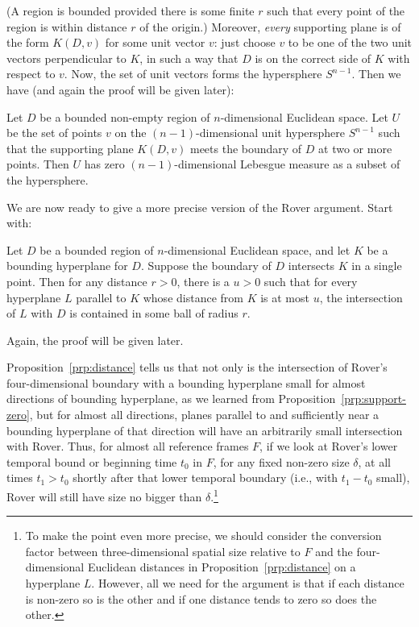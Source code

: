 (A region is bounded provided there is some finite $r$ such that every point of the region is within distance $r$ of the origin.) Moreover, \textit{every} supporting plane is of the form $K(D,v)$ for some unit vector $v$: just choose $v$ to be one of the two unit vectors perpendicular to $K$, in such a way that $D$ is on the correct side of $K$ with respect to $v$. Now, the set of unit vectors forms the hypersphere $S^{n-1}$. Then we have (and again the proof will be given later):

\begin{prp}\label{prp:support-zero}
Let $D$ be a bounded non-empty region of $n$-dimensional Euclidean space. Let $U$ be the set of points $v$ on the 
$(n-1)$-dimensional unit hypersphere $S^{n-1}$ such that the supporting plane $K(D,v)$ meets the boundary of $D$ at two or more points. Then $U$ has zero $(n-1)$-dimensional Lebesgue measure as a subset of the hypersphere.
\end{prp}

We are now ready to give a more precise version of the Rover argument. Start with:

\begin{prp}\label{prp:distance} Let $D$ be a bounded region of $n$-dimensional Euclidean space, and let $K$ be a bounding hyperplane for $D$. Suppose the boundary of $D$ intersects $K$ in a single point. Then for any distance $r>0$, there is a $u>0$ such that for every hyperplane $L$ parallel to $K$ whose distance from $K$ is at most $u$, the intersection of $L$ with $D$ is contained in some ball of radius $r$.
\end{prp}

Again, the proof will be given later.

Proposition~\ref{prp:distance} tells us that not only is the intersection of Rover's four-dimensional
boundary with a bounding hyperplane small for almost directions of bounding hyperplane, as we learned from 
Proposition~\ref{prp:support-zero}, but for almost all directions, planes parallel to and sufficiently near
a bounding hyperplane of that direction will have an arbitrarily small intersection with Rover. Thus, for almost
all reference frames $F$, if we look at Rover's lower temporal bound or beginning time $t_0$ in $F$, for any fixed
non-zero size $\delta$, at all times $t_1>t_0$ shortly after that lower temporal boundary (i.e., with $t_1-t_0$ 
small), Rover will still have size no bigger than $\delta$.\footnote{To make the point even more precise, we should
consider the conversion factor between three-dimensional spatial size relative to $F$ and the four-dimensional Euclidean distances in Proposition~\ref{prp:distance} on a hyperplane $L$. However, all we need for the argument is that if 
each distance is non-zero so is the other and if one distance tends to zero so does the other.}

